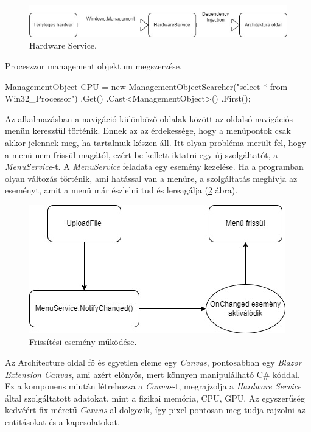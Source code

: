 \begin{figure}[h]
\centering
\includegraphics[width=\textwidth]{images/HWS.jpg}
\caption{Hardware Service.}
\label{fig:hws}
\end{figure}

Proceszzor management objektum megszerzése.
\begin{cpp}
ManagementObject CPU = 
	new ManagementObjectSearcher("select * from Win32_Processor")
            .Get()
            .Cast<ManagementObject>()
            .First();
\end{cpp}

Az alkalmazásban a navigáció különböző oldalak között az oldalsó navigációs menün keresztül történik. Ennek az az érdekessége, hogy a menüpontok csak akkor jelennek meg, ha tartalmuk készen áll. Itt olyan probléma merült fel, hogy a menü nem frissül magától, ezért be kellett iktatni egy új szolgáltatót, a \textit{MenuService}-t. A \textit{MenuService} feladata egy esemény kezelése. Ha a programban olyan változás történik, ami hatással van a menüre, a szolgáltatás meghívja az eseményt, amit a menü már észlelni tud és lereagálja (\ref{fig:MenuEvent} ábra). 

\begin{figure}[h]
\centering
\includegraphics[scale=0.8]{images/MenuS.jpg}
\caption{Frissítési esemény működése.}
\label{fig:MenuEvent}
\end{figure}

Az Architecture oldal fő és egyetlen eleme egy \textit{Canvas}, pontosabban egy \textit{Blazor Extension Canvas}, ami azért előnyös, mert könnyen manipulálható C\# kóddal. Ez a komponens miután létrehozza a \textit{Canvas}-t, megrajzolja a \textit{Hardware Service} által szolgáltatott adatokat, mint a fizikai memória, CPU, GPU. Az egyszerűség kedvéért fix méretű \textit{Canvas}-al dolgozik, így pixel pontosan meg tudja rajzolni az entitásokat és a kapcsolatokat.

